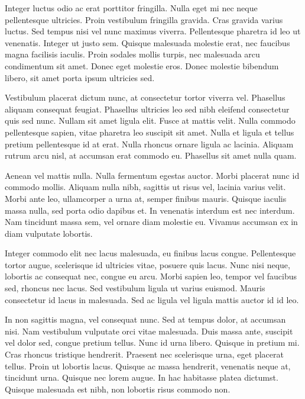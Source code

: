 \documentclass{novel}
\begin{document}

Integer luctus odio ac erat porttitor fringilla. Nulla eget mi nec neque pellentesque ultricies. Proin vestibulum fringilla gravida. Cras gravida varius luctus. Sed tempus nisi vel nunc maximus viverra. Pellentesque pharetra id leo ut venenatis. Integer ut justo sem. Quisque malesuada molestie erat, nec faucibus magna facilisis iaculis. Proin sodales mollis turpis, nec malesuada arcu condimentum sit amet. Donec eget molestie eros. Donec molestie bibendum libero, sit amet porta ipsum ultricies sed.

Vestibulum placerat dictum nunc, at consectetur tortor viverra vel. Phasellus aliquam consequat feugiat. Phasellus ultricies leo sed nibh eleifend consectetur quis sed nunc. Nullam sit amet ligula elit. Fusce at mattis velit. Nulla commodo pellentesque sapien, vitae pharetra leo suscipit sit amet. Nulla et ligula et tellus pretium pellentesque id at erat. Nulla rhoncus ornare ligula ac lacinia. Aliquam rutrum arcu nisl, at accumsan erat commodo eu. Phasellus sit amet nulla quam.

Aenean vel mattis nulla. Nulla fermentum egestas auctor. Morbi placerat nunc id commodo mollis. Aliquam nulla nibh, sagittis ut risus vel, lacinia varius velit. Morbi ante leo, ullamcorper a urna at, semper finibus mauris. Quisque iaculis massa nulla, sed porta odio dapibus et. In venenatis interdum est nec interdum. Nam tincidunt massa sem, vel ornare diam molestie eu. Vivamus accumsan ex in diam vulputate lobortis.

Integer commodo elit nec lacus malesuada, eu finibus lacus congue. Pellentesque tortor augue, scelerisque id ultricies vitae, posuere quis lacus. Nunc nisi neque, lobortis ac consequat nec, congue eu arcu. Morbi sapien leo, tempor vel faucibus sed, rhoncus nec lacus. Sed vestibulum ligula ut varius euismod. Mauris consectetur id lacus in malesuada. Sed ac ligula vel ligula mattis auctor id id leo.

In non sagittis magna, vel consequat nunc. Sed at tempus dolor, at accumsan nisi. Nam vestibulum vulputate orci vitae malesuada. Duis massa ante, suscipit vel dolor sed, congue pretium tellus. Nunc id urna libero. Quisque in pretium mi. Cras rhoncus tristique hendrerit. Praesent nec scelerisque urna, eget placerat tellus. Proin ut lobortis lacus. Quisque ac massa hendrerit, venenatis neque at, tincidunt urna. Quisque nec lorem augue. In hac habitasse platea dictumst. Quisque malesuada est nibh, non lobortis risus commodo non.
\end{document}
